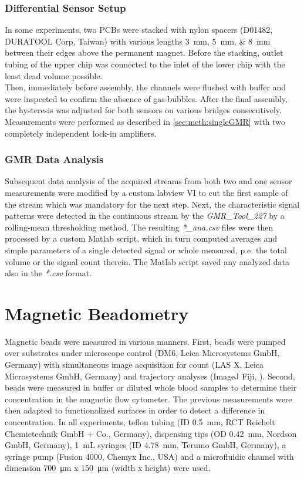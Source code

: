\subsubsection{Differential Sensor Setup}
In some experiments, two PCBs were stacked with nylon spacers (D01482, DURATOOL Corp, Taiwan) with various lengths \SIlist{3;5;8}{\milli\meter} between their edges above the permanent magnet. Before the stacking, outlet tubing of the upper chip was connected to the inlet of the lower chip with the least dead volume possible.\\ Then, immediately before assembly, the channels were flushed with buffer and were inspected to confirm the absence of gas-bubbles. After the final assembly, the hysteresis was adjusted for both sensors on various bridges consecutively. Measurements were performed as described in \ref{sec:meth:singleGMR} with two completely independent lock-in amplifiers.
\subsubsection{GMR Data Analysis} \label{sec:meth:gmrDataAnalysis}
Subsequent data analysis of the acquired streams from both two and one sensor measurements were modified by a custom labview VI to cut the first sample of the stream which was mandatory for the next step. Next, the characteristic signal patterns were detected in the continuous stream by the \textit{GMR\_Tool\_227} by a rolling-mean thresholding method. The resulting \textit{*\_ana.csv} files were then processed by a custom Matlab script, which in turn computed averages and simple parameters of a single detected signal or whole measured, p.e. the total volume or the signal count therein. The Matlab script saved any analyzed data also in the \textit{*.csv} format.
\section{Magnetic Beadometry}
Magnetic beads were measured in various manners. First, beads were pumped over substrates under microscope control (DM6, Leica Microsystems GmbH, Germany) with simultaneous image acquisition for count (LAS X, Leica Microsystems GmbH, Germany) and trajectory analyses (ImageJ Fiji, \cite{lit:chem:Fiji}). Second, beads were measured in buffer or diluted whole blood samples to determine their concentration in the magnetic flow cytometer. The previous measurements were then adapted to functionalized surfaces in order to detect a difference in concentration. In all experiments, teflon tubing (ID \SI{0.5}{\milli\meter}, RCT Reichelt Chemietechnik GmbH + Co., Germany), dispensing tips (OD \SI{0.42}{\milli\meter}, Nordson GmbH, Germany), \SI{1}{\milli\liter} syringes (ID \SI{4.78}{\milli\meter}, Terumo GmbH, Germany), a syringe pump (Fusion 4000, Chemyx Inc., USA) and a microfluidic channel with dimension \SI{700}{\micro\meter} x \SI{150}{\micro\meter} (width x height) were used.
